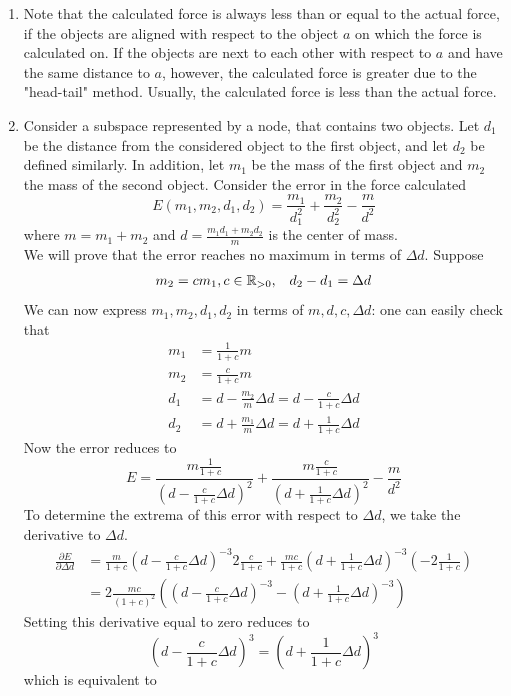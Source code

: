 \begin{enumerate}
\item Note that the calculated force is always less than or equal to the actual force, if the objects are aligned with respect to the object $a$ on which the force is calculated on. If the objects are next to each other with respect to $a$ and have the same distance to $a$, however, the calculated force is greater due to the "head-tail" method. Usually, the calculated force is less than the actual force.
\item Consider a subspace represented by a node, that contains two objects. Let $d_1$ be the distance from the considered object to the first object, and let $d_2$ be defined similarly. In addition, let $m_1$ be the mass of the first object and $m_2$ the mass of the second object. Consider the error in the force calculated
\[
E(m_1,m_2,d_1,d_2) = \frac{m_1}{d_1^2}+\frac{m_2}{d_2^2}-\frac{m}{d^2}
\]
where $m = m_1+m_2$ and $d = \frac{m_1d_1+m_2d_2}{m}$ is the center of mass.\\
We will prove that the error reaches no maximum in terms of $\Delta d$. Suppose
\[
\begin{array}{cc}
m_2 = cm_1, c\in \mathbb{R}_{>0}, & d_2-d_1 = \Delta d
\end{array}
\]
We can now express $m_1,m_2,d_1,d_2$ in terms of $m,d,c,\Delta d$: one can easily check that
\begin{align*}
m_1 &= \frac{1}{1+c}m\\
m_2 &= \frac{c}{1+c}m\\
d_1 &= d-\frac{m_2}{m}\Delta d = d-\frac{c}{1+c}\Delta d\\
d_2 &= d+\frac{m_1}{m}\Delta d = d+\frac{1}{1+c}\Delta d
\end{align*}
Now the error reduces to
\[
E = \frac{m\frac{1}{1+c}}{(d-\frac{c}{1+c}\Delta d)^2}+\frac{m\frac{c}{1+c}}{(d+\frac{1}{1+c}\Delta d)^2}-\frac{m}{d^2}
\]
To determine the extrema of this error with respect to $\Delta d$, we take the derivative to $\Delta d$.
\begin{align*}
\frac{\partial E}{\partial \Delta d} &= \frac{m}{1+c}\left(d-\frac{c}{1+c}\Delta d\right)^{-3}2\frac{c}{1+c}+\frac{mc}{1+c}\left(d+\frac{1}{1+c}\Delta d\right)^{-3}\left(-2\frac{1}{1+c}\right)\\
&= 2\frac{mc}{(1+c)^2}\left(\left(d-\frac{c}{1+c}\Delta d\right)^{-3}-\left(d+\frac{1}{1+c}\Delta d\right)^{-3}\right)
\end{align*}
Setting this derivative equal to zero reduces to
\[
\left(d-\frac{c}{1+c}\Delta d\right)^3 = \left(d+\frac{1}{1+c}\Delta d\right)^3
\]
which is equivalent to

\end{enumerate}
